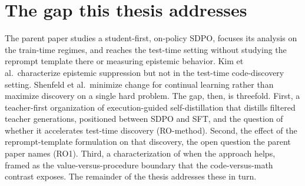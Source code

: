\section{The gap this thesis addresses}\label{the-gap-this-thesis-addresses}

The parent paper studies a student-first, on-policy SDPO, focuses its analysis on the train-time regimes, and reaches the test-time setting without studying the reprompt template there or measuring epistemic behavior. Kim et al.~characterize epistemic suppression but not in the test-time code-discovery setting. Shenfeld et al.~minimize change for continual learning rather than maximize discovery on a single hard problem. The gap, then, is threefold. First, a teacher-first organization of execution-guided self-distillation that distills filtered teacher generations, positioned between SDPO and SFT, and the question of whether it accelerates test-time discovery (RO-method). Second, the effect of the reprompt-template formulation on that discovery, the open question the parent paper names (RO1). Third, a characterization of when the approach helps, framed as the value-versus-procedure boundary that the code-versus-math contrast exposes. The remainder of the thesis addresses these in turn.
